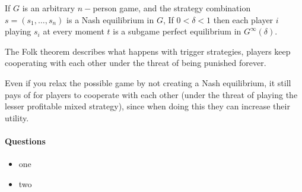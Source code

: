 \documentclass{article}
\begin{document}
If $G$ is an arbitrary $n-$person game, and the strategy combination
$s=(s_1,\dots,s_n)$ is a Nash equilibrium in $G$, If $0<\delta<1$ then each
player $i$ playing $s_i$ at every moment $t$ is a subgame perfect
equilibrium in $G^\infty(\delta)$.

The Folk theorem describes what happens with trigger strategies, players
keep cooperating with each other under the threat of being punished forever.

Even if you relax the possible game by not creating a Nash equilibrium, it
still pays of for players to cooperate with each other (under the threat
of playing the lesser profitable mixed strategy), since when doing
this they can increase their utility.
\paragraph{Questions}
\begin{itemize}
	\item one
	\item two
\end{itemize}
\end{document}
